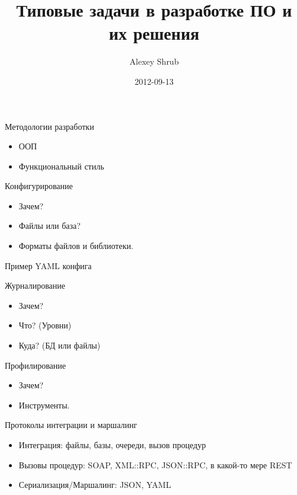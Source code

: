 \documentclass[aspectratio=169]{beamer}
\title{Типовые задачи в разработке ПО и их решения}
\author{Alexey Shrub}
\date{2012-09-13}
\begin{document}
\maketitle

\begin{frame}{Методологии разработки}
\begin{itemize}
\item ООП
\pause
\item Функциональный стиль
\end{itemize}
\end{frame}

\begin{frame}{Конфигурирование}
\begin{itemize}
\item Зачем?
\pause
\item Файлы или база?
\pause
\item Форматы файлов и библиотеки.
\end{itemize}
\end{frame}

\begin{frame}{Пример YAML конфига}

%
\end{frame}

\begin{frame}{Журналирование}
\begin{itemize}
\item Зачем?
\pause
\item Что? (Уровни)
\pause
\item Куда? (БД или файлы)
\end{itemize}
\end{frame}

\begin{frame}{Профилирование}
\begin{itemize}
\item Зачем?
\pause
\item Инструменты.
\end{itemize}
\end{frame}

\begin{frame}{Протоколы интеграции и маршалинг}
\begin{itemize}
\item Интеграция: файлы, базы, очереди, вызов процедур
\pause
\item Вызовы процедур: SOAP, XML::RPC, JSON::RPC, в какой-то мере REST
\pause
\item Сериализация/Маршалинг: JSON, YAML
\end{itemize}
\end{frame}
\end{document}

